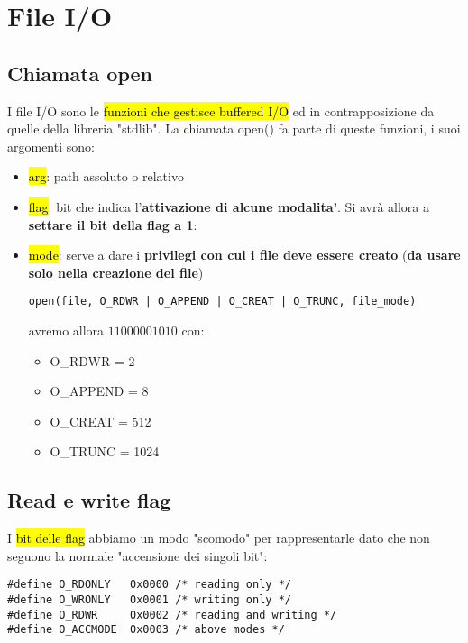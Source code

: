 \newpage
\section{File I/O}


\subsection{Chiamata open}

I file I/O sono le \hl{funzioni che gestisce buffered I/O} ed in contrapposizione da quelle della libreria "stdlib". La chiamata open() fa parte di queste funzioni, i suoi argomenti sono:

\begin{itemize}
	\item \hl{arg}: path assoluto o relativo
	\item \hl{flag}: bit che indica l'\textbf{attivazione di alcune modalita'}. Si avrà allora a \textbf{settare il bit della flag a 1}:
	\item \hl{mode}: serve a dare i \textbf{privilegi con cui i file deve essere creato} (\textbf{da usare solo nella creazione del file})
\begin{lstlisting}
open(file, O_RDWR | O_APPEND | O_CREAT | O_TRUNC, file_mode)
\end{lstlisting}

		avremo allora $11000001010$ con:
		
		\begin{itemize}
			\item[] O\_RDWR = 2
			\item[] O\_APPEND = 8
			\item[] O\_CREAT = 512
			\item[] O\_TRUNC = 1024
		\end{itemize}
		
\end{itemize}


\subsection{Read e write flag}

I \hl{bit delle flag} abbiamo un modo "scomodo" per rappresentarle dato che non seguono la normale "accensione dei singoli bit":

\begin{lstlisting}
#define O_RDONLY   0x0000 /* reading only */
#define O_WRONLY   0x0001 /* writing only */
#define O_RDWR     0x0002 /* reading and writing */
#define O_ACCMODE  0x0003 /* above modes */
\end{lstlisting}

